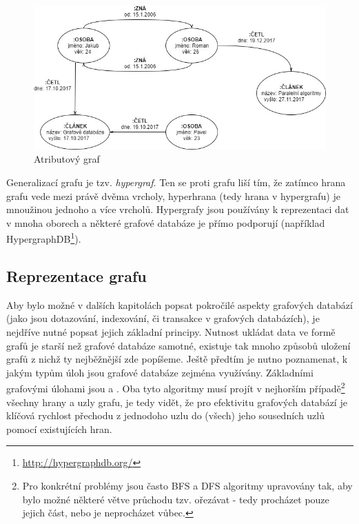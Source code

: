 \begin{figure}
\begin{center}
\includegraphics[width=12cm]{figures/property_graph}
\caption{Atributový graf}
\label{fig:property_graf}
\end{center}
\end{figure}

Generalizací grafu je tzv. \textit{hypergraf}. Ten se proti grafu liší tím, že zatímco hrana grafu vede mezi právě dvěma vrcholy, hyperhrana (tedy hrana v hypergrafu) je mnoužinou jednoho a více vrcholů.\cite{Diestel00} Hypergrafy jsou používány k reprezentaci dat v mnoha oborech a některé grafové databáze je přímo podporují (například HypergraphDB\footnote{\url{http://hypergraphdb.org/}}).


\subsection{Reprezentace grafu}
\label{sec:gdb-reprezentace}
Aby bylo možné v dalších kapitolách popsat pokročilé aspekty grafových databází (jako jsou dotazování, indexování, či transakce v grafových databázích), je nejdříve nutné popsat jejich základní principy. Nutnost ukládat data ve formě grafů je starší než grafové databáze samotné, existuje tak mnoho způsobů uložení grafů z nichž ty nejběžnější zde popíšeme. Ještě předtím je nutno poznamenat, k jakým typům úloh jsou grafové databáze zejména využívány. Základními grafovými úlohami jsou  a . Oba tyto algoritmy musí projít v nejhorším případě\footnote{Pro konkrétní problémy jsou často BFS a DFS algoritmy upravovány tak, aby bylo možné některé větve průchodu tzv. ořezávat - tedy procházet pouze jejich část, nebo je neprocházet vůbec.} všechny hrany a uzly grafu, je tedy vidět, že pro efektivitu grafových databází je klíčová rychlost přechodu z jednodoho uzlu do (všech) jeho sousedních uzlů pomocí existujících hran.

